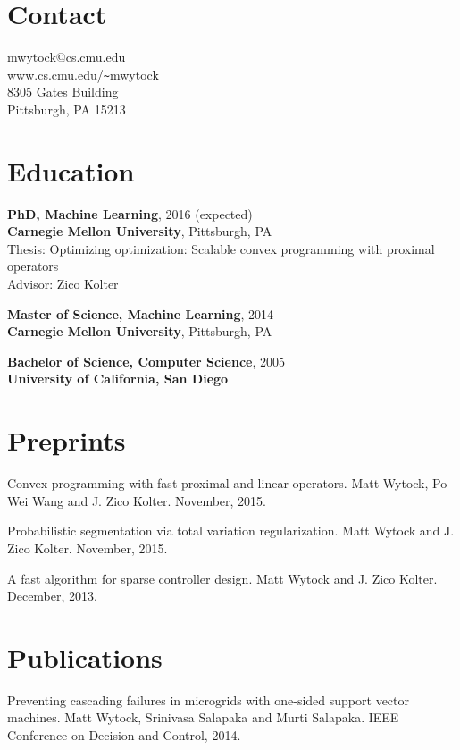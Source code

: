 \documentclass[margin, line]{res}
\begin{document}
\renewcommand{\namefont}{\Huge\bf}


\begin{resume}
\section{Contact}
mwytock@cs.cmu.edu \\
www.cs.cmu.edu/\verb+~+mwytock \\
8305 Gates Building \\
Pittsburgh, PA 15213

\section{Education}

{\bf PhD, Machine Learning}, 2016 (expected) \\
{\bf Carnegie Mellon University}, Pittsburgh, PA \\
Thesis: Optimizing optimization: Scalable convex programming with proximal operators \\
Advisor: Zico Kolter

{\bf Master of Science, Machine Learning}, 2014 \\
{\bf Carnegie Mellon University}, Pittsburgh, PA

{\bf Bachelor of Science, Computer Science}, 2005 \\
{\bf University of California, San Diego}

\section{Preprints}

Convex programming with fast proximal and linear operators. Matt Wytock, Po-Wei
Wang and J. Zico Kolter. November, 2015.

Probabilistic segmentation via total variation regularization. Matt Wytock and
J. Zico Kolter. November, 2015.

A fast algorithm for sparse controller design. Matt Wytock and J. Zico
Kolter. December, 2013.

\section{Publications}

Preventing cascading failures in microgrids with one-sided support vector
machines. Matt Wytock, Srinivasa Salapaka and Murti Salapaka. IEEE
Conference on Decision and Control, 2014.


\end{resume}
\end{document}
